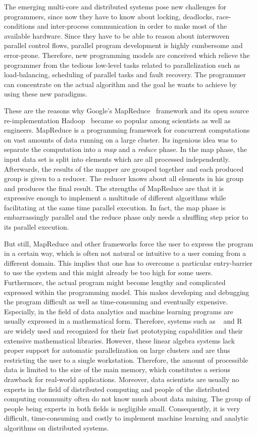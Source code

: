 The emerging multi-core and distributed systems pose new challenges for programmers, since now they have to know about locking, deadlocks, race-conditions and inter-process communication in order to make most of the available hardware.
Since they have to be able to reason about interwoven parallel control flows, parallel program development is highly cumbersome and error-prone.
Therefore, new programming models are conceived which relieve the programmer from the tedious low-level tasks related to parallelization such as load-balancing, scheduling of parallel tasks and fault recovery.
The programmer can concentrate on the actual algorithm and the goal he wants to achieve by using these new paradigms.

These are the reasons why Google's MapReduce~\cite{dean:c2008a} framework and its open source re-implementation Hadoop~\cite{hadoop:2008a} became so popular among scientists as well as engineers.
MapReduce is a programming framework for concurrent computations on vast amounts of data running on a large cluster.
Its ingenious idea was to separate the computation into a \emph{map} and a \emph{reduce} phase.
In the map phase, the input data set is split into elements which are all processed independently.
Afterwards, the results of the mapper are grouped together and each produced group is given to a reducer.
The reducer knows about all elements in his group and produces the final result.
The strengths of MapReduce are that it is expressive enough to implement a multitude of different algorithms while facilitating at the same time parallel execution.
In fact, the map phase is embarrassingly parallel and the reduce phase only needs a shuffling step prior to its parallel execution.

But still, MapReduce and other frameworks force the user to express the program in a certain way, which is often not natural or intuitive to a user coming from a different domain.
This implies that one has to overcome a particular entry-barrier to use the system and this might already be too high for some users.
Furthermore, the actual program might become lengthy and complicated expressed within the programming model.
This makes developing and debugging the program difficult as well as time-consuming and eventually expensive.
Especially, in the field of data analytics and machine learning programs are usually expressed in a mathematical form.
Therefore, systems such as \matlab~\cite{matlab} and R~\cite{r:1993a} are widely used and recognized for their fast prototyping capabilities and their extensive mathematical libraries.
However, these linear algebra systems lack proper support for automatic parallelization on large clusters and are thus restricting the user to a single workstation.
Therefore, the amount of processible data is limited to the size of the main memory, which constitutes a serious drawback for real-world applications.
Moreover, data scientists are usually no experts in the field of distributed computing and people of the distributed computing community often do not know much about data mining.
The group of people being experts in both fields is negligible small.
Consequently, it is very difficult, time-consuming and costly to implement machine learning and analytic algorithms on distributed systems.

